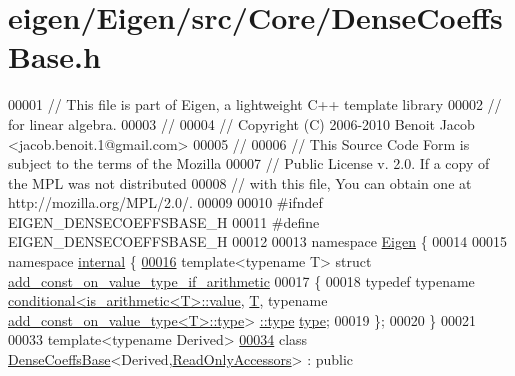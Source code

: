 \hypertarget{eigen_2_eigen_2src_2_core_2_dense_coeffs_base_8h_source}{}\section{eigen/\+Eigen/src/\+Core/\+Dense\+Coeffs\+Base.h}
\label{eigen_2_eigen_2src_2_core_2_dense_coeffs_base_8h_source}

\begin{DoxyCode}
00001 \textcolor{comment}{// This file is part of Eigen, a lightweight C++ template library}
00002 \textcolor{comment}{// for linear algebra.}
00003 \textcolor{comment}{//}
00004 \textcolor{comment}{// Copyright (C) 2006-2010 Benoit Jacob <jacob.benoit.1@gmail.com>}
00005 \textcolor{comment}{//}
00006 \textcolor{comment}{// This Source Code Form is subject to the terms of the Mozilla}
00007 \textcolor{comment}{// Public License v. 2.0. If a copy of the MPL was not distributed}
00008 \textcolor{comment}{// with this file, You can obtain one at http://mozilla.org/MPL/2.0/.}
00009 
00010 \textcolor{preprocessor}{#ifndef EIGEN\_DENSECOEFFSBASE\_H}
00011 \textcolor{preprocessor}{#define EIGEN\_DENSECOEFFSBASE\_H}
00012 
00013 \textcolor{keyword}{namespace }\hyperlink{namespace_eigen}{Eigen} \{
00014 
00015 \textcolor{keyword}{namespace }\hyperlink{namespaceinternal}{internal} \{
\hyperlink{struct_eigen_1_1internal_1_1add__const__on__value__type__if__arithmetic}{00016} \textcolor{keyword}{template}<\textcolor{keyword}{typename} T> \textcolor{keyword}{struct }\hyperlink{struct_eigen_1_1internal_1_1add__const__on__value__type__if__arithmetic}{add\_const\_on\_value\_type\_if\_arithmetic}
00017 \{
00018   \textcolor{keyword}{typedef} \textcolor{keyword}{typename} \hyperlink{struct_eigen_1_1internal_1_1conditional}{conditional<is\_arithmetic<T>::value}, 
      \hyperlink{group___sparse_core___module}{T}, \textcolor{keyword}{typename} \hyperlink{group___sparse_core___module}{add\_const\_on\_value\_type<T>::type}>
      \hyperlink{class_eigen_1_1internal_1_1_tensor_lazy_evaluator_writable}{::type} \hyperlink{class_eigen_1_1internal_1_1_tensor_lazy_evaluator_writable}{type};
00019 \};
00020 \}
00021 
00033 \textcolor{keyword}{template}<\textcolor{keyword}{typename} Derived>
\hyperlink{group___core___module}{00034} \textcolor{keyword}{class }\hyperlink{class_eigen_1_1_dense_coeffs_base}{DenseCoeffsBase}<Derived,\hyperlink{group__enums_gga9f93eac38eb83deb0e8dbd42ddf11d5da42865f87356ad7e585a1bfbfd1b81699}{ReadOnlyAccessors}> : \textcolor{keyword}{public} 

\end{DoxyCode}
